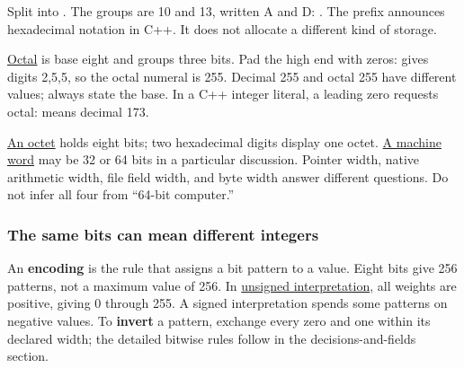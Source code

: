 Split  into . The groups are 10 and 13, written A and D: . The prefix  announces hexadecimal notation in C++. It does not allocate a different kind of storage.

\hyperref[appendix-17fc1bc8b305]{Octal} is base eight and groups three bits. Pad the high end with zeros:  gives digits 2,5,5, so the octal numeral is 255. Decimal 255 and octal 255 have different values; always state the base. In a C++ integer literal, a leading zero requests octal:  means decimal 173.

\hyperref[appendix-5bee2df85484]{An octet} holds eight bits; two hexadecimal digits display one octet. \hyperref[appendix-d67a19507dc5]{A machine word} may be 32 or 64 bits in a particular discussion. Pointer width, native arithmetic width, file field width, and byte width answer different questions. Do not infer all four from ``64-bit computer.''

\subsubsection{The same bits can mean different integers}\label{01-foundations-i-ch001-the-same-bits-can-mean-different-integers}

\hypertarget{01-foundations-i-ch001-the-same-bits-can-mean-different-integers}{}

An \textbf{encoding} is the rule that assigns a bit pattern to a value. Eight bits give 256 patterns, not a maximum value of 256. In \hyperref[appendix-c99977d88b33]{unsigned interpretation}, all weights are positive, giving 0 through 255. A signed interpretation spends some patterns on negative values. To \textbf{invert} a pattern, exchange every zero and one within its declared width; the detailed bitwise rules follow in the decisions-and-fields section.

